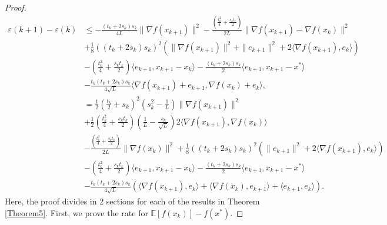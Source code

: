 \documentclass{article}
\theoremstyle{plain}
\theoremstyle{definition}
\theoremstyle{remark}
\begin{document}
\begin{proof}
\begin{align}
            \varepsilon(k+1)-\varepsilon(k)&\leq -\frac{(t_k+2s_k)s_k}{4L} \|\nabla f(x_{k+1})\|^2-\frac{(\frac{t_{k}^2}{4}+\frac{s_{k}t_{k}}{2})}{2L}\|\nabla f(x_{k+1})-\nabla f(x_k)\|^2\nonumber\\
            &+\frac{1}{8}((t_k+2s_k)s_k)^2(\|\nabla f(x_{k+1})\|^2+\|e_{k+1}\|^2+2\langle \nabla f(x_{k+1}) ,e_k \rangle) \nonumber\\
            & -(\frac{t_k^2}{4}+\frac{s_kt_k}{2})\langle e_{k+1},x_{k+1}-x_k\rangle-\frac{(t_k+2s_k)s_k}{2}\langle e_{k+1},x_{k+1}-x^*\rangle\nonumber\\
         & -\frac{t_k(t_k+2s_k)s_k}{4\sqrt{L}}\langle \nabla f(x_{k+1})+e_{k+1}, \nabla f(x_k)+e_k \rangle,\nonumber\\
         &=\frac{1}{2}\left(\frac{t_k}{2}+s_k\right)^2(s_k^2-\frac{1}{L})\|\nabla f(x_{k+1})\|^2\nonumber\\
         &+\frac{1}{2}\left(\frac{t_k^2}{4}+\frac{s_kt_k}{2} \right)(\frac{1}{L}-\frac{s_k}{\sqrt{L}}) 2\langle \nabla f(x_{k+1}),\nabla f(x_k) \rangle\nonumber\\
         &-\frac{(\frac{t_{k}^2}{4}+\frac{s_{k}t_{k}}{2})}{2L}\|\nabla f(x_k)\|^2+\frac{1}{8}((t_k+2s_k)s_k)^2(\|e_{k+1}\|^2+2\langle \nabla f(x_{k+1}) ,e_k \rangle)\nonumber\\
         & -(\frac{t_k^2}{4}+\frac{s_kt_k}{2})\langle e_{k+1},x_{k+1}-x_k\rangle-\frac{(t_k+2s_k)s_k}{2}\langle e_{k+1},x_{k+1}-x^*\rangle\nonumber\\
         &-\frac{t_k(t_k+2s_k)s_k}{4\sqrt{L}}\left(\langle \nabla f(x_{k+1}),e_k \rangle+\langle \nabla f(x_{k}) , e_{k+1}\rangle+\langle e_{k+1},e_k\rangle\right).
        \end{align}
        Here, the proof divides in 2 sections for each of the results in Theorem \ref{Theorem5}. First, we prove the rate for $\mathbb E\left[f(x_k)\right]-f(x^*)$. 
        

\end{proof}
\end{document}
